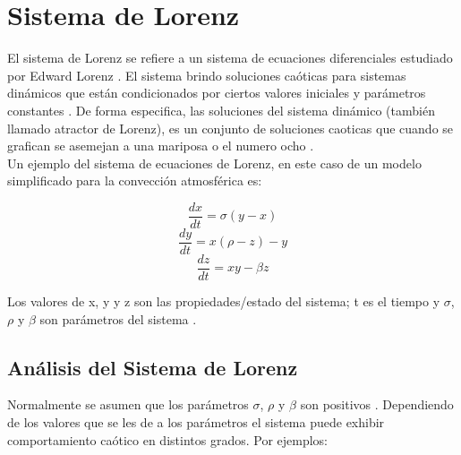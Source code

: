 \documentclass[12pt,letterpaper]{article}
\begin{document}

\section{Sistema de Lorenz}


El sistema de Lorenz se refiere a un sistema de ecuaciones diferenciales estudiado por Edward Lorenz \cite{a}. El sistema brindo soluciones caóticas para sistemas dinámicos que están condicionados por ciertos valores iniciales y parámetros constantes \cite{a}.
De forma especifica, las soluciones del sistema dinámico (también llamado atractor de Lorenz), es un conjunto de soluciones caoticas que cuando se grafican se asemejan a una mariposa o el numero ocho \cite{a}. \\

Un ejemplo del sistema de ecuaciones de Lorenz, en este caso de un modelo simplificado para la convección atmosférica es\cite{a}:

\begin{equation}
\frac{dx}{dt} = \sigma (y-x) 
\end{equation}
\begin{equation}
\frac{dy}{dt} = x(\rho - z) - y
\end{equation}
\begin{equation}
\frac{dz}{dt} = xy - \beta z
\end{equation}

Los valores de x, y y z son las propiedades/estado del sistema; t es el tiempo y $\sigma$, $\rho$ y $\beta$ son parámetros del sistema \cite{a}.\\

\subsection{Análisis del Sistema de Lorenz}

Normalmente se asumen que los parámetros $\sigma$, $\rho$ y $\beta$ son positivos \cite{a}. Dependiendo de los valores que se les de a los parámetros el sistema puede exhibir comportamiento caótico en distintos grados. Por ejemplos:
\end{document}
